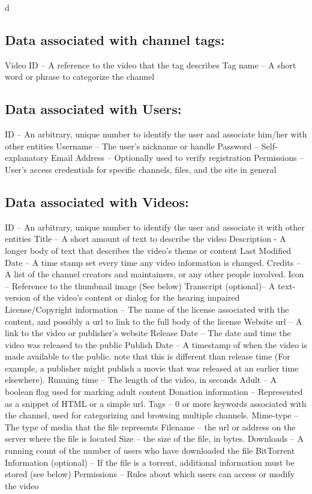 d\documentclass[a4paper,12pt]{report}
\begin{document}
\subsection{Data associated with channel tags:}
Video ID – A reference to the video that the tag describes
Tag name – A short word or phrase to categorize the channel

\subsection{Data associated with Users:}
ID – An arbitrary, unique number to identify the user and associate him/her with other entities
Username – The user's nickname or handle
Password – Self-explanatory
Email Address – Optionally used to verify registration
Permissions – User's access credentials for specific channels, files, and the site in general

\subsection{Data associated with Videos:}
ID – An arbitrary, unique number to identify the user and associate it with other entities 
Title – A short amount of text to describe the video
Description - A longer body of text that describes the video's theme or content
Last Modified Date – A time stamp set every time any video information is changed.
Credits – A list of the channel creators and maintainers, or any other people involved. 
Icon – Reference to the thumbnail image (See below)
Transcript (optional)– A text-version of the video's content or dialog for the hearing impaired
License/Copyright information – The name of the license associated with the content, and possibly a url to link to the full body of the license
Website url – A link to the video  or publisher's website
Release Date – The date and time the video was released to the public
Publish Date – A timestamp of when the video is made available to the public. note that this is different than release time (For example, a publisher might publish a movie that was released at an earlier time elsewhere).
Running time – The length of the video, in seconds
Adult – A boolean flag used for marking adult content
Donation information – Represented as a snippet of HTML or a simple url.
Tags – 0 or more keywords associated with the channel, used for categorizing and 	browsing multiple channels.
Mime-type – The type of media that the file represents
Filename – the url or address on the server where the file is located
Size – the size of the file, in bytes.
Downloads – A running count of the number of users who have downloaded the file
BitTorrent Information (optional) – If the file is a torrent, additional information must be stored (see below)
Permissions – Rules about which users can access or modify the video
\end{document}
